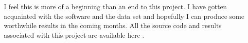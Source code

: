 \documentclass[11pt]{article}
\begin{document}
    
    \vspace{0.3in}

    I feel this is more of a beginning than an end to this project.
    I have gotten acquainted with the software and the data set and hopefully I can produce
    some worthwhile results in the coming months.
    All the source code and results associated with this project are available here \cite{IvanCode}.







\end{document}
